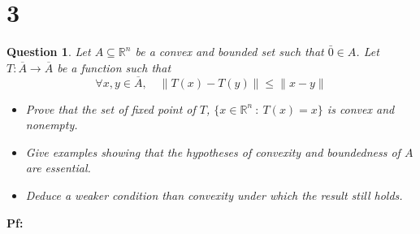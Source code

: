 \documentclass{article}
\newtheorem{question}{Question}
\begin{document}
\section*{3}
\begin{myBox}[]{}
    \begin{question}
        Let $A\subseteq \mathbb{R}^n$ be a convex and bounded set such that $\bar{0}\in A$. 
        Let $T:\overline{A}\rightarrow\overline{A}$ be a function such that 
        $$\forall x,y\in\overline{A},\quad \|T(x)-T(y)\|\leq \|x-y\|$$
        \begin{itemize}
            \item[(a)] Prove that the set of fixed point of $T$, $\{x\in\mathbb{R}^n\ :\ T(x)=x\}$ is convex and nonempty.
            \item[(b)] Give examples showing that the hypotheses of convexity and boundedness of $A$ are essential.
            \item[(c)] Deduce a weaker condition than convexity under which the result still holds.  
        \end{itemize}
    \end{question}
\end{myBox}

\textbf{Pf:}
\end{document}
